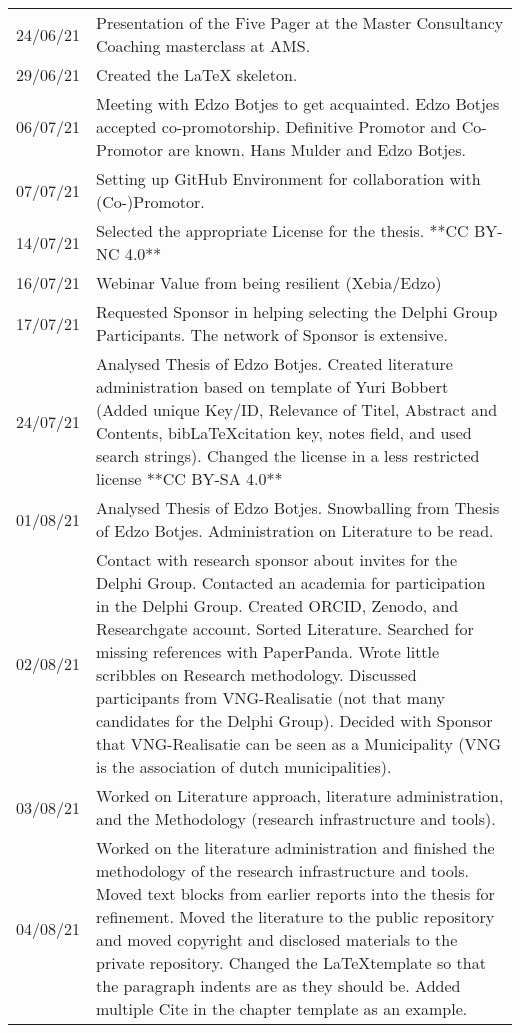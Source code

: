 \begin{longtable}{p{}p{}}
			24/06/21 & Presentation of the Five Pager at the Master Consultancy Coaching masterclass at AMS.\\%
			29/06/21 & Created the LaTeX skeleton.\\%
			06/07/21 & Meeting with Edzo Botjes to get acquainted. Edzo Botjes accepted co-promotorship. Definitive Promotor and Co-Promotor are known. Hans Mulder and Edzo Botjes.\\%
			07/07/21 & Setting up GitHub Environment for collaboration with (Co-)Promotor.\\%
			14/07/21 & Selected the appropriate License for the thesis. **CC BY-NC 4.0**\\%
			16/07/21 & Webinar Value from being resilient (Xebia/Edzo)\\%
			17/07/21 & Requested Sponsor in helping selecting the Delphi Group Participants. The network of Sponsor is extensive.\\%
			24/07/21 & Analysed Thesis of Edzo Botjes. Created literature administration based on template of Yuri Bobbert (Added unique Key/ID, Relevance of Titel, Abstract and Contents, bib\LaTeX citation key, notes field, and used search strings). Changed the license in a less restricted license **CC BY-SA 4.0**\\%
			01/08/21 & Analysed Thesis of Edzo Botjes. Snowballing from Thesis of Edzo Botjes. Administration on Literature to be read.\\%
			02/08/21 & Contact with research sponsor about invites for the Delphi Group. Contacted an academia for participation in the Delphi Group. Created ORCID, Zenodo, and Researchgate account. Sorted Literature. Searched for missing references with PaperPanda. Wrote little scribbles on Research methodology. Discussed participants from VNG-Realisatie (not that many candidates for the Delphi Group). Decided with Sponsor that VNG-Realisatie can be seen as a Municipality (VNG is the association of dutch municipalities).\\%
			03/08/21 & Worked on Literature approach, literature administration, and the Methodology (research infrastructure and tools).\\%
			04/08/21 & Worked on the literature administration and finished the methodology of the research infrastructure and tools. Moved text blocks from earlier reports into the thesis for refinement. Moved the literature to the public repository and moved copyright and disclosed materials to the private repository. Changed the \LaTeX template so that the paragraph indents are as they should be. Added multiple Cite in the chapter template as an example.\\%

\end{longtable}
